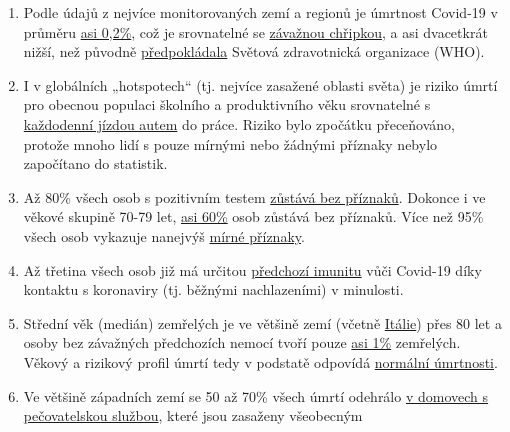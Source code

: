 \begin{enumerate}
\def\labelenumi{\arabic{enumi}.}
\tightlist
\item
  Podle údajů z nejvíce monitorovaných zemí a regionů je úmrtnost
  Covid-19 v průměru
  \href{https://swprs.org/studies-on-covid-19-lethality/}{asi 0,2\%},
  což je srovnatelné se
  \href{https://www.ebm-netzwerk.de/en/publications/covid-19}{závažnou
  chřipkou}, a asi dvacetkrát nižší, než původně
  \href{https://www.businessinsider.com/coronavirus-death-rate-by-age-countries-2020-3}{předpokládala}
  Světová zdravotnická organizace (WHO).
\item
  I v globálních „hotspotech`` (tj. nejvíce zasažené oblasti světa) je
  riziko úmrtí pro obecnou populaci školního a produktivního věku
  srovnatelné s
  \href{https://www.medrxiv.org/content/10.1101/2020.04.05.20054361v1}{každodenní
  jízdou autem} do práce. Riziko bylo zpočátku přeceňováno, protože
  mnoho lidí s pouze mírnými nebo žádnými příznaky nebylo započítano do
  statistik.
\item
  Až 80\% všech osob s pozitivním testem
  \href{https://www.bmj.com/content/369/bmj.m1375}{zůstává bez
  příznaků}. Dokonce i ve věkové skupině 70-79 let,
  \href{https://www.niid.go.jp/niid/en/2019-ncov-e/9407-covid-dp-fe-01.html}{asi
  60\%} osob zůstává bez příznaků. Více než 95\% všech osob vykazuje
  nanejvýš
  \href{https://swprs.org/studies-on-covid-19-lethality/\#hospitalizations}{mírné
  příznaky}.
\item
  Až třetina všech osob již má určitou
  \href{https://www.medrxiv.org/content/10.1101/2020.04.17.20061440v1}{předchozí
  imunitu} vůči Covid-19 díky kontaktu s koronaviry (tj. běžnými
  nachlazeními) v minulosti.
\item
  Střední věk (medián) zemřelých je ve většině zemí (včetně
  \href{https://www.epicentro.iss.it/coronavirus/sars-cov-2-decessi-italia}{Itálie})
  přes 80 let a osoby bez závažných předchozích nemocí tvoří pouze
  \href{https://www.bloomberg.com/news/articles/2020-03-18/99-of-those-who-died-from-virus-had-other-illness-italy-says}{asi
  1\%} zemřelých. Věkový a rizikový profil úmrtí tedy v podstatě
  odpovídá
  \href{https://www.vienna.at/analyse-zeigt-covid-19-opferkurve-entspricht-normaler-mortalitaet/6581246}{normální
  úmrtnosti}.
\item
  Ve většině západních zemí se 50 až 70\% všech úmrtí odehrálo
  \href{https://ltccovid.org/2020/04/12/mortality-associated-with-covid-19-outbreaks-in-care-homes-early-international-evidence/}{v
  domovech s pečovatelskou službou}, které jsou zasaženy všeobecným

\end{enumerate}
